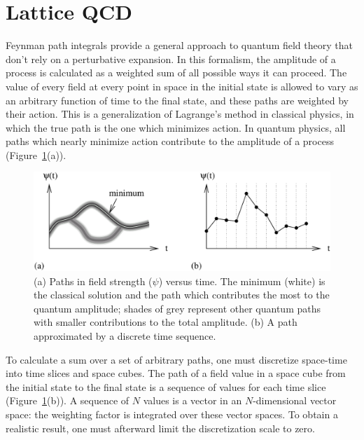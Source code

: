 \documentclass{cornell}
\begin{document}
\section{Lattice QCD}

Feynman path integrals provide a general approach to quantum field
theory that don't rely on a perturbative expansion.  In this
formalism, the amplitude of a process is calculated as a weighted sum
of all possible ways it can proceed.  The value of every field at
every point in space in the initial state is allowed to vary as an
arbitrary function of time to the final state, and these paths are
weighted by their action.  This is a generalization of Lagrange's
method in classical physics, in which the true path is the one which
minimizes action.  In quantum physics, all paths which nearly minimize
action contribute to the amplitude of a process (Figure~\ref{pathintegrals}(a)).

\begin{figure}[p]
  \begin{center}
    \includegraphics[width=\linewidth]{plots/pathintegrals}
  \end{center}
  \caption[Path integrals and path integrals in discretized
  space-time]{\label{pathintegrals} (a) Paths in field strength
  ($\psi$) versus time.  The minimum (white) is the classical solution
  and the path which contributes the most to the quantum amplitude;
  shades of grey represent other quantum paths with smaller
  contributions to the total amplitude.  (b) A path approximated by a
  discrete time sequence.}
\end{figure}

To calculate a sum over a set of arbitrary paths, one must discretize
space-time into time slices and space cubes.  The path of a field
value in a space cube from the initial state to the final state is a
sequence of values for each time slice (Figure~\ref{pathintegrals}(b)).
A sequence of $N$ values is a vector in an $N$-dimensional vector
space: the weighting factor is integrated over these vector spaces.
To obtain a realistic result, one must afterward limit the
discretization scale to zero.
\end{document}
